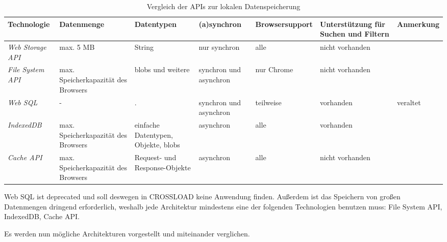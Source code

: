 \begin{sidewaystable}[h]
  \renewcommand{\arraystretch}{1.2}
  \centering
  \sffamily
  \begin{footnotesize}
    \begin{tabularx}{1.0\textwidth}{l L L L l l L}
      \toprule
      \textbf{Technologie} & \textbf{Datenmenge} & \textbf{Datentypen} & \textbf{(a)synchron} & \textbf{Browsersupport} & \textbf{Unterstützung für Suchen und Filtern} & \textbf{Anmerkung} \\
      \midrule
      \emph{Web Storage \ac{API}} & max. 5 \ac{MB} & String & nur synchron & alle & nicht vorhanden & \\
      \emph{File System \ac{API}} & max. Speicherkapazität des Browsers & \acp{blob} und weitere & synchron und asynchron & nur Chrome & nicht vorhanden &  \\
      \emph{Web SQL} & - & . & synchron und asynchron & teilweise & vorhanden & veraltet \\
      \emph{IndexedDB} & max. Speicherkapazität des Browsers & einfache Datentypen, Objekte, \acp{blob} & asynchron & alle & vorhanden & \\
      \emph{Cache \ac{API}} & max. Speicherkapazität des Browsers & Request- und Response-Objekte & asynchron & alle & nicht vorhanden & \\
      \bottomrule
    \end{tabularx}
  \end{footnotesize}
  \rmfamily
  \caption{Vergleich der APIs zur lokalen Datenspeicherung}
  \label{Kap4:Datenspeicherung}
\end{sidewaystable}

\clearpage

Web SQL ist deprecated und soll deswegen in CROSSLOAD keine Anwendung finden. Außerdem ist das Speichern von großen Datenmengen dringend erforderlich, weshalb jede Architektur mindestens eine der folgenden Technologien benutzen muss: File System \ac{API}, IndexedDB, Cache \ac{API}.

Es werden nun mögliche Architekturen vorgestellt und miteinander verglichen. 

